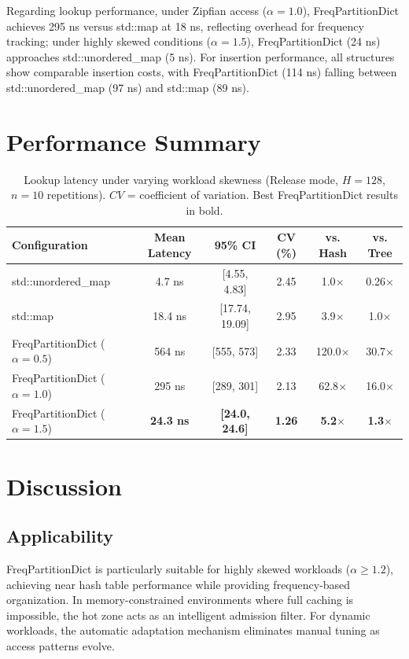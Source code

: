 \documentclass[11pt,a4paper]{article}
\begin{document}
Regarding lookup performance, under Zipfian access ($\alpha = 1.0$), FreqPartitionDict achieves 295 ns versus std::map at 18 ns, reflecting overhead for frequency tracking; under highly skewed conditions ($\alpha = 1.5$), FreqPartitionDict (24 ns) approaches std::unordered\_map (5 ns). For insertion performance, all structures show comparable insertion costs, with FreqPartitionDict (114 ns) falling between std::unordered\_map (97 ns) and std::map (89 ns).

\section{Performance Summary}

\begin{table}[H]
\centering
\caption{Lookup latency under varying workload skewness (Release mode, $H = 128$, $n = 10$ repetitions). $CV$ = coefficient of variation. Best FreqPartitionDict results in bold.}
\label{tab:performance}
\begin{tabular}{lccccc}
\toprule
\textbf{Configuration} & \textbf{Mean Latency} & \textbf{95\% CI} & \textbf{CV (\%)} & \textbf{vs. Hash} & \textbf{vs. Tree} \\
\midrule
std::unordered\_map & 4.7 ns & [4.55, 4.83] & 2.45 & 1.0$\times$ & 0.26$\times$ \\
std::map & 18.4 ns & [17.74, 19.09] & 2.95 & 3.9$\times$ & 1.0$\times$ \\
FreqPartitionDict ($\alpha = 0.5$) & 564 ns & [555, 573] & 2.33 & 120.0$\times$ & 30.7$\times$ \\
FreqPartitionDict ($\alpha = 1.0$) & 295 ns & [289, 301] & 2.13 & 62.8$\times$ & 16.0$\times$ \\
FreqPartitionDict ($\alpha = 1.5$) & \textbf{24.3 ns} & \textbf{[24.0, 24.6]} & \textbf{1.26} & \textbf{5.2$\times$} & \textbf{1.3$\times$} \\
\bottomrule
\end{tabular}
\end{table}

\section{Discussion}

\subsection{Applicability}

FreqPartitionDict is particularly suitable for highly skewed workloads ($\alpha \geq 1.2$), achieving near hash table performance while providing frequency-based organization. In memory-constrained environments where full caching is impossible, the hot zone acts as an intelligent admission filter. For dynamic workloads, the automatic adaptation mechanism eliminates manual tuning as access patterns evolve.
\end{document}
